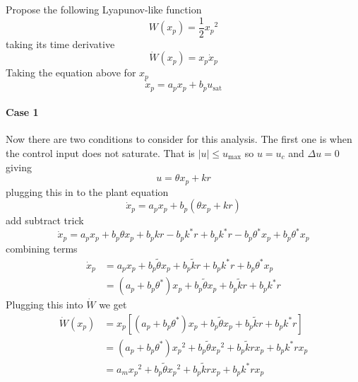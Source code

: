 Propose the following Lyapunov-like function
\begin{equation*}
  W(x_{p})=\frac{1}{2}x_{p}{}^{2}
\end{equation*}
taking its time derivative
\begin{equation*}
  \dot{W}(x_{p})=x_{p}\dot{x}_{p}
\end{equation*}
Taking the equation above for $x_{p}$
\begin{equation*}
  \dot{x}_{p}=a_{p}x_{p}+b_{p}u_{\text{sat}}
\end{equation*}

\paragraph{Case 1}
Now there are two conditions to consider for this analysis.
The first one is when the control input does not saturate.
That is $|u|\leq u_{\text{max}}$ so $u=u_{c}$ and $\Delta u=0$ giving
\begin{equation*}
  u=\theta x_{p}+kr
\end{equation*}
plugging this in to the plant equation
\begin{equation*}
  \dot{x}_{p}=a_{p}x_{p}+b_{p}(\theta x_{p}+kr)
\end{equation*}
add subtract trick
\begin{equation*}
  \dot{x}_{p}=a_{p}x_{p}+b_{p}\theta x_{p}+b_{p}kr-b_{p}k^{*}r+b_{p}k^{*}r-b_{p}\theta^{*}x_{p}+b_{p}\theta^{*}x_{p}
\end{equation*}
combining terms
\begin{equation*}
  \begin{split}
    \dot{x}_{p}&=a_{p}x_{p}+b_{p}\tilde{\theta}x_{p}+b_{p}\tilde{k}r+b_{p}k^{*}r+b_{p}\theta^{*}x_{p} \\
    &=(a_{p}+b_{p}\theta^{*})x_{p}+b_{p}\tilde{\theta}x_{p}+b_{p}\tilde{k}r+b_{p}k^{*}r
  \end{split}
\end{equation*}
Plugging this into $\dot{W}$ we get
\begin{equation*}
  \begin{split}
    \dot{W}(x_{p})&=x_{p}[(a_{p}+b_{p}\theta^{*})x_{p}+b_{p}\tilde{\theta}x_{p}+b_{p}\tilde{k}r+b_{p}k^{*}r] \\
    &=(a_{p}+b_{p}\theta^{*})x_{p}{}^{2}+b_{p}\tilde{\theta}x_{p}{}^{2}+b_{p}\tilde{k}rx_{p}+b_{p}k^{*}rx_{p} \\
    &=a_{m}x_{p}{}^{2}+b_{p}\tilde{\theta}x_{p}{}^{2}+b_{p}\tilde{k}rx_{p}+b_{p}k^{*}rx_{p}
  \end{split}
\end{equation*}
